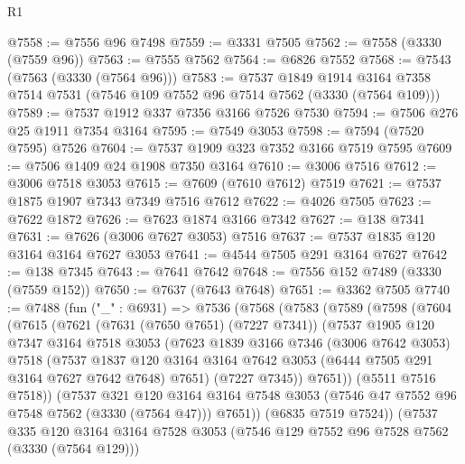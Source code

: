\begin{lexlean}{R1}
\begin{coremodule}
@7558 := @7556 @96 @7498
@7559 := @3331 @7505
@7562 := @7558 (@3330 (@7559 @96))
@7563 := @7555 @7562
@7564 := @6826 @7552
@7568 := @7543 (@7563 (@3330 (@7564 @96)))
@7583 := @7537
    @1849
    @1914
    @3164
    @7358
    @7514
    @7531
    (@7546 @109 @7552 @96 @7514 @7562 (@3330 (@7564 @109)))
@7589 := @7537 @1912 @337 @7356 @3166 @7526 @7530
@7594 := @7506 @276 @25 @1911 @7354 @3164
@7595 := @7549 @3053
@7598 := @7594 (@7520 @7595) @7526
@7604 := @7537 @1909 @323 @7352 @3166 @7519 @7595
@7609 := @7506 @1409 @24 @1908 @7350 @3164
@7610 := @3006 @7516
@7612 := @3006 @7518 @3053
@7615 := @7609 (@7610 @7612) @7519
@7621 := @7537 @1875 @1907 @7343 @7349 @7516 @7612
@7622 := @4026 @7505
@7623 := @7622 @1872
@7626 := @7623 @1874 @3166 @7342
@7627 := @138 @7341
@7631 := @7626 (@3006 @7627 @3053) @7516
@7637 := @7537 @1835 @120 @3164 @3164 @7627 @3053
@7641 := @4544 @7505 @291 @3164 @7627
@7642 := @138 @7345
@7643 := @7641 @7642
@7648 := @7556 @152 @7489 (@3330 (@7559 @152))
@7650 := @7637 (@7643 @7648)
@7651 := @3362 @7505
@7740 := @7488
    (fun ("_" : @6931) =>
    @7536
      (@7568
        (@7583
          (@7589
            (@7598
              (@7604
                (@7615
                  (@7621
                    (@7631 (@7650 @7651) (@7227 @7341))
                    (@7537
                      @1905
                      @120
                      @7347
                      @3164
                      @7518
                      @3053
                      (@7623
                        @1839
                        @3166
                        @7346
                        (@3006 @7642 @3053)
                        @7518
                        (@7537
                          @1837
                          @120
                          @3164
                          @3164
                          @7642
                          @3053
                          (@6444 @7505 @291 @3164 @7627 @7642 @7648)
                          @7651)
                        (@7227 @7345))
                      @7651))
                  (@5511 @7516 @7518))
                (@7537
                  @321
                  @120
                  @3164
                  @3164
                  @7548
                  @3053
                  (@7546 @47 @7552 @96 @7548 @7562 (@3330 (@7564 @47)))
                  @7651))
              (@6835 @7519 @7524))
            (@7537
              @335
              @120
              @3164
              @3164
              @7528
              @3053
              (@7546 @129 @7552 @96 @7528 @7562 (@3330 (@7564 @129)))

\end{coremodule}
\end{lexlean}
